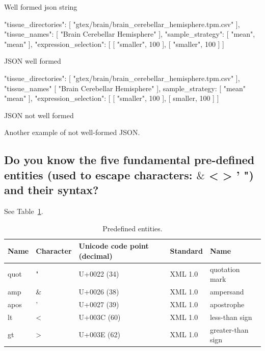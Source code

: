 \documentclass{article}
\begin{document}
Well formed json string

\begin{center}
\begin{listing}[!ht]
  \begin{json}
    {
      "tissue_directories": [
            "gtex/brain/brain_cerebellar_hemisphere.tpm.csv"
      ],
      "tissue_names": [
            "Brain Cerebellar Hemisphere"
      ],
      "sample_strategy": [
            "mean",
            "mean"
      ],
      "expression_selection": [
            [
                  "smaller",
                  100
            ],
            [
                  "smaller",
                  100
            ]
      ]
    }
  \end{json}
  \caption[Test]{JSON well formed}
  \label{lst:test}
\end{listing}
\end{center}

\begin{center}
\begin{listing}[!ht]
  \begin{json}

      "tissue_directories": [
            "gtex/brain/brain_cerebellar_hemisphere.tpm.csv"
      ],
      "tissue_names" [
            "Brain Cerebellar Hemisphere"
      ],
      sample_strategy: [
            "mean"
            "mean"
      ],
      "expression_selection": [
            [
                  "smaller",
                  100
            ],
            [
                  smaller,
                  100
            ]
      ]

  \end{json}
  \caption[Test]{JSON not well formed}
  \label{lst:test2}
\end{listing}
\end{center}

Another example of not well-formed JSON.

\subsection{Do you know the five fundamental pre-defined entities (used to escape characters: $\&$ < > ' ") and their syntax?}

See Table~\ref{tab:predefinedentitites}.

\begin{table}
  \centering
  \begin{tabular}{lllll}
    \toprule
    Name & Character & Unicode code point (decimal) & Standard & Name\\
    \midrule
    quot & " & U+0022 (34) & XML 1.0 & quotation mark\\
    amp  & \& & U+0026 (38) & XML 1.0 & ampersand\\
    apos & ' & U+0027 (39) & XML 1.0 & apostrophe \\
    lt & < & U+003C (60) & XML 1.0 & less-than sign\\
    gt & > & U+003E (62) & XML 1.0 & greater-than sign\\
    \bottomrule
  \end{tabular}
  \caption{Predefined entities. }
  \label{tab:predefinedentitites}
\end{table}
\end{document}
